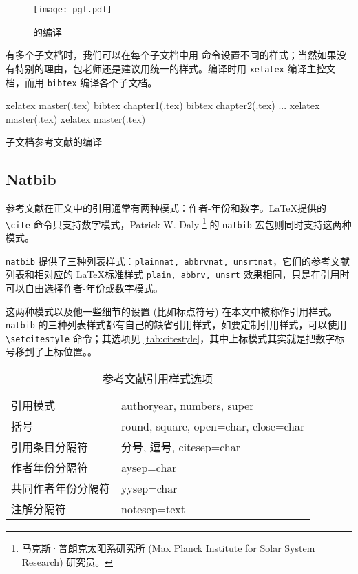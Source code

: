 \begin{figure}[htbp]
\centering
\texttt{[image: pgf.pdf]}
\caption{\BibTeX 的编译}
\label{fig:bibtex}
\end{figure}

有多个子文档时，我们可以在每个子文档中用 \verb|| 命令设置不同的样式；当然如果没有特别的理由，包老师还是建议用统一的样式。编译时用 \texttt{xelatex} 编译主控文档，而用 \texttt{bibtex} 编译各个子文档。

\begin{example}[h]
\begin{Code}[numbers=left]
xelatex master(.tex)
bibtex chapter1(.tex)
bibtex chapter2(.tex)
...
xelatex master(.tex)
xelatex master(.tex)
\end{Code}
\caption{子文档参考文献的编译}
\label{exa:subdoc_bibtex}
\end{example}

\subsection{Natbib}

参考文献在正文中的引用通常有两种模式：作者-年份和数字。\LaTeX 提供的 \verb|\cite| 命令只支持数字模式，Patrick W. Daly\indexDaly{} \footnote{马克斯·普朗克太阳系研究所 (Max Planck Institute for Solar System Research) 研究员。} 的 \texttt{natbib} 宏包\citep{Daly_2010}则同时支持这两种模式。

\texttt{natbib} 提供了三种列表样式：\texttt{plainnat, abbrvnat, unsrtnat}，它们的参考文献列表和相对应的 \LaTeX 标准样式 \texttt{plain, abbrv, unsrt} 效果相同，只是在引用时可以自由选择作者-年份或数字模式。

这两种模式以及他一些细节的设置 (比如标点符号) 在本文中被称作引用样式。\texttt{natbib} 的三种列表样式都有自己的缺省引用样式，如要定制引用样式，可以使用 \verb|\setcitestyle| 命令；其选项见 \autoref{tab:citestyle}，其中上标模式其实就是把数字标号移到了上标位置。。

\begin{table}[htbp]
\caption{参考文献引用样式选项}
\label{tab:citestyle}
\centering
\begin{tabular}{ll}
    \toprule
    引用模式            & authoryear, numbers, super \\
    括号                & round, square, open={char}, close={char} \\
    引用条目分隔符      & 分号, 逗号, citesep={char} \\
    作者年份分隔符      & aysep={char} \\
    共同作者年份分隔符  & yysep={char} \\
    注解分隔符          & notesep={text} \\
    \bottomrule
\end{tabular}
\end{table}

